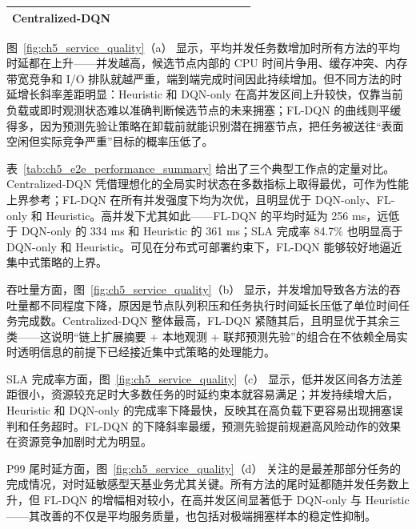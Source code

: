 \begin{table}[t]
{\begin{tabular}{l|cccc|cccc|cccc}
            Centralized-DQN
             & \cellcolor{bestcolor}{130}
             & \cellcolor{bestcolor}{61}
             & \cellcolor{bestcolor}{97.7}
             & \cellcolor{bestcolor}{202}
             & \cellcolor{bestcolor}{181}
             & \cellcolor{bestcolor}{54}
             & \cellcolor{bestcolor}{94.0}
             & \cellcolor{bestcolor}{273}
             & \cellcolor{bestcolor}{247}
             & \cellcolor{bestcolor}{46}
             & \cellcolor{bestcolor}{86.5}
             & \cellcolor{bestcolor}{387}                                                                 \\
            \bottomrule
        \end{tabular}}
\end{table}

图~\ref{fig:ch5_service_quality}（a） 显示，平均并发任务数增加时所有方法的平均时延都在上升——并发越高，候选节点内部的 CPU 时间片争用、缓存冲突、内存带宽竞争和 I/O 排队就越严重，端到端完成时间因此持续增加。但不同方法的时延增长斜率差距明显：Heuristic 和 DQN-only 在高并发区间上升较快，仅靠当前负载或即时观测状态难以准确判断候选节点的未来拥塞；FL-DQN 的曲线则平缓得多，因为预测先验让策略在卸载前就能识别潜在拥塞节点，把任务被送往“表面空闲但实际竞争严重”目标的概率压低了。

表~\ref{tab:ch5_e2e_performance_summary} 给出了三个典型工作点的定量对比。Centralized-DQN 凭借理想化的全局实时状态在多数指标上取得最优，可作为性能上界参考；FL-DQN 在所有并发强度下均为次优，且明显优于 DQN-only、FL-only 和 Heuristic。高并发下尤其如此——FL-DQN 的平均时延为 256 ms，远低于 DQN-only 的 334 ms 和 Heuristic 的 361 ms；SLA 完成率 84.7\% 也明显高于 DQN-only 和 Heuristic。可见在分布式可部署约束下，FL-DQN 能够较好地逼近集中式策略的上界。

吞吐量方面，图~\ref{fig:ch5_service_quality}（b） 显示，并发增加导致各方法的吞吐量都不同程度下降，原因是节点队列积压和任务执行时间延长压低了单位时间任务完成数。Centralized-DQN 整体最高，FL-DQN 紧随其后，且明显优于其余三类——这说明“链上扩展摘要 + 本地观测 + 联邦预测先验”的组合在不依赖全局实时透明信息的前提下已经接近集中式策略的处理能力。

SLA 完成率方面，图~\ref{fig:ch5_service_quality}（c） 显示，低并发区间各方法差距很小，资源较充足时大多数任务的时延约束本就容易满足；并发持续增大后，Heuristic 和 DQN-only 的完成率下降最快，反映其在高负载下更容易出现拥塞误判和任务超时。FL-DQN 的下降斜率最缓，预测先验提前规避高风险动作的效果在资源竞争加剧时尤为明显。

P99 尾时延方面，图~\ref{fig:ch5_service_quality}（d） 关注的是最差那部分任务的完成情况，对时延敏感型天基业务尤其关键。所有方法的尾时延都随并发任务数上升，但 FL-DQN 的增幅相对较小，在高并发区间显著低于 DQN-only 与 Heuristic——其改善的不仅是平均服务质量，也包括对极端拥塞样本的稳定性抑制。

